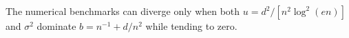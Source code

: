 The numerical benchmarks can diverge only when both \(u=d^2/[n^2\log^2(en)]\) and \(\sigma^2\) dominate \(b=n^{-1}+d/n^2\) while tending to zero.